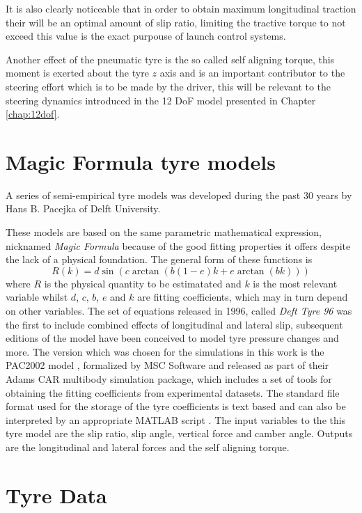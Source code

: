It is also clearly noticeable that in order to obtain maximum longitudinal traction their will be an optimal amount of slip ratio, limiting the tractive torque to not exceed this value is the exact purpouse of launch control systems.

Another effect of the pneumatic tyre is the so called self aligning torque, this moment is exerted about the tyre $z$ axis and is an important contributor to the steering effort which is to be made by the driver, this will be relevant to the steering dynamics introduced in the 12 DoF model presented in Chapter \ref{chap:12dof}.

\section{Magic Formula tyre models}
\label{sec:mf}
A series of semi-empirical tyre models was developed during the past 30 years by Hans B. Pacejka of Delft University.

These models are based on the same parametric mathematical expression, nicknamed \textit{Magic Formula} because of the good fitting properties it offers despite the lack of a physical foundation. The general form of these functions is
$$ R(k) = d\sin(c\arctan(b(1-e)k+e\arctan(bk))) $$
where $R$ is the physical quantity to be estimatated and $k$ is the most relevant variable whilst $d$, $c$, $b$, $e$ and $k$ are fitting coefficients, which may in turn depend on other variables.
The set of equations released in 1996, called \textit{Deft Tyre 96}  was the first to include combined effects of longitudinal and lateral slip, subsequent editions of the model have been conceived to model tyre pressure changes  and more.
The version which was chosen for the simulations in this work is the PAC2002 model , formalized by MSC Software and released as part of their Adams CAR multibody simulation package, which includes a set of tools for obtaining the fitting coefficients from experimental datasets. The standard file format used for the storage of the tyre coefficients is text based and can also be interpreted by an appropriate MATLAB script .
The input variables to the this tyre model are the slip ratio, slip angle, vertical force and camber angle. Outputs are the longitudinal and lateral forces and the self aligning torque.

\section{Tyre Data}
\label{sec:tyredata}

